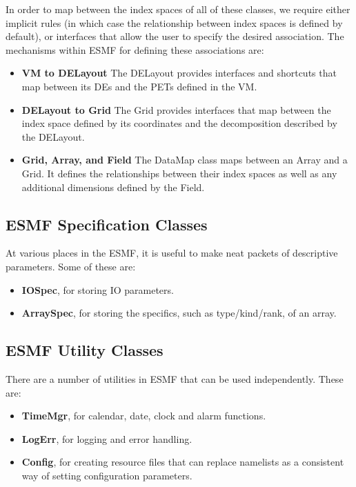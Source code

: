 In order to map between the index spaces of all of these classes,
we require either implicit rules (in which case the relationship 
between index spaces is defined by default), or interfaces that 
allow the user to specify the desired association.  The mechanisms
within ESMF for defining these associations are:

\begin{itemize}

\item {\bf VM to DELayout} The DELayout provides interfaces and 
shortcuts that map between its DEs and the PETs defined in the 
VM.

\item {\bf DELayout to Grid} The Grid provides interfaces that map 
between the index space defined by its coordinates and the decomposition 
described by the DELayout.

\item {\bf Grid, Array, and Field} The DataMap class maps between 
an Array and a Grid.  It defines the relationships between their
index spaces as well as any additional dimensions defined by the Field.

\end{itemize}

\subsection{ESMF Specification Classes}

At various places in the ESMF, it is useful to make neat packets
of descriptive parameters.  Some of these are:
\begin{itemize}
\item {\bf IOSpec}, for storing IO parameters.
\item {\bf ArraySpec}, for storing the specifics, such as type/kind/rank,
of an array.
\end{itemize}

\subsection{ESMF Utility Classes}

There are a number of utilities in ESMF that can be used independently.
These are:
\begin{itemize}
\item {\bf TimeMgr}, for calendar, date, clock and alarm functions.
\item {\bf LogErr}, for logging and error handling.
\item {\bf Config}, for creating resource files that can replace namelists
as a consistent way of setting configuration parameters.
\end{itemize}

